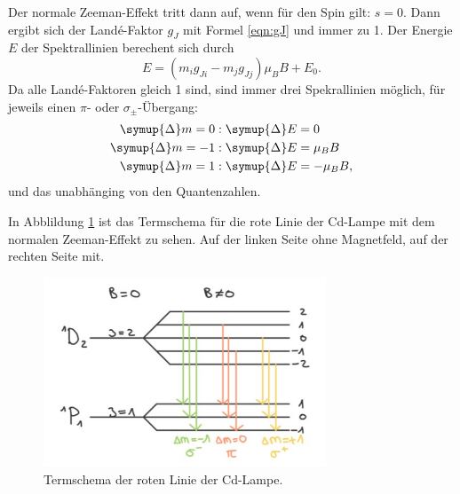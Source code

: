 Der normale Zeeman-Effekt tritt dann auf, wenn für den Spin gilt: $s=0$. Dann ergibt sich der 
Landé-Faktor $g_J$ mit Formel \ref{eqn:gJ} und immer zu 1. 
Der Energie $E$ der Spektrallinien berechent sich durch
\begin{equation}
    E = (m_i g_{Ji} - m_j g_{Jj}) \mu_B B + E_0.
    \label{eqn:E}
\end{equation}
Da alle Landé-Faktoren gleich 1 sind, sind immer drei Spekrallinien möglich, 
für jeweils einen $\pi$- oder $\sigma_{\pm}$-Übergang:
\begin{align*}
    \symup{\Delta}m = 0 &: \symup{\Delta}E = 0 \\
    \symup{\Delta}m = -1 &: \symup{\Delta}E =\mu_B B\\
    \symup{\Delta}m  = 1 &: \symup{\Delta}E =- \mu_B B,
\end{align*}
und das unabhänging von den Quantenzahlen.

In Abblildung \ref{fig:rot} ist das Termschema für die rote Linie der Cd-Lampe mit dem normalen 
Zeeman-Effekt zu sehen. Auf der linken 
Seite ohne Magnetfeld, auf der rechten Seite mit. 

\begin{figure}
  \centering
  \includegraphics[width=0.75\textwidth]{rot2.png}
  \caption{Termschema der roten Linie der Cd-Lampe.}
  \label{fig:rot}
\end{figure}





